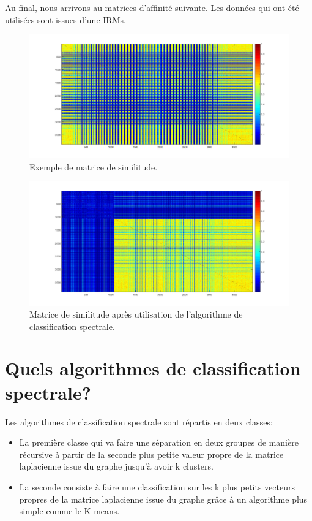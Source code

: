 Au final, nous arrivons au matrices d'affinité suivante. Les données qui ont été utilisées sont issues d'une IRMs.

\begin{figure}[H]
\centering
    \includegraphics[scale=0.45,angle=0]{Images/MatrixAffinity2.png}
    \caption{Exemple de matrice de similitude.}
    \label{fig:MatrixAffinity2}
\end{figure}


\begin{figure}[H]
\centering
    \includegraphics[scale=0.45,angle=0]{Images/MatrixAffinity.png}
    \caption{Matrice de similitude après utilisation de l'algorithme de classification spectrale.}
    \label{fig:MatrixAffinity}
\end{figure}


\chapter{Quels algorithmes de classification spectrale?}


Les algorithmes de classification spectrale sont répartis en deux classes:

\begin{itemize}
\item La première classe qui va faire une séparation en deux groupes de manière récursive à partir de la seconde plus petite valeur propre de la matrice laplacienne issue du graphe jusqu'à avoir k clusters.
\item La seconde consiste à faire une classification sur les k plus petits vecteurs propres de la matrice laplacienne issue du graphe grâce à un algorithme plus simple comme le K-means.
\end{itemize}

